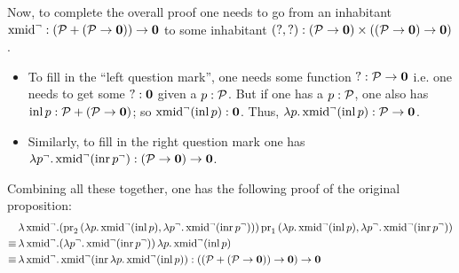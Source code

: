Now, to complete the overall proof one needs to go from an inhabitant $\text{xmid}^{\neg} : (\mathcal{P} + (\mathcal{P} \to \textbf{0})) \to \textbf{0}$ to some inhabitant $(?,?) : (\mathcal{P} \to \textbf{0}) \times ((\mathcal{P} \to \textbf{0}) \to \textbf{0})$.
\begin{itemize}
\item To fill in the ``left question mark'', one needs some function $? : \mathcal{P} \to \textbf{0}$ i.e. one needs to get some $? : \textbf{0}$ given a $p : \mathcal{P}$. But if one has a $p : \mathcal{P}$, one also has $\text{inl}\,p : \mathcal{P} + (\mathcal{P} \to \textbf{0})$; so $\text{xmid}^{\neg}(\text{inl}\,p) : \textbf{0}$. Thus, $\lambda p.\,\text{xmid}^{\neg}(\text{inl}\,p) : \mathcal{P} \to \textbf{0}$.
\item Similarly, to fill in the right question mark one has $\lambda p^{\neg}.\,\text{xmid}^{\neg}(\text{inr}\,p^{\neg}) : (\mathcal{P} \to \textbf{0}) \to \textbf{0}$.
\end{itemize}

Combining all these together, one has the following proof of the original proposition:
\begin{align*}
	&\lambda \,\text{xmid}^{\neg}. (\text{pr}_{2}\,(\lambda p.\,\text{xmid}^{\neg}(\text{inl}\,p),\lambda p^{\neg}.\,\text{xmid}^{\neg}(\text{inr}\,p^{\neg})))\,\text{pr}_{1}\,(\lambda p.\,\text{xmid}^{\neg}(\text{inl}\,p),\lambda p^{\neg}.\,\text{xmid}^{\neg}(\text{inr}\,p^{\neg})) \\
	\equiv \, &\lambda \,\text{xmid}^{\neg}. (\lambda p^{\neg}.\,\text{xmid}^{\neg}(\text{inr}\,p^{\neg}))\,\lambda p.\,\text{xmid}^{\neg}(\text{inl}\,p) \\
	\equiv \, &\lambda \,\text{xmid}^{\neg}. \,\text{xmid}^{\neg}(\text{inr}\,\lambda p.\,\text{xmid}^{\neg}(\text{inl}\,p)) : ((\mathcal{P} + (\mathcal{P} \to \textbf{0})) \to \textbf{0}) \to \textbf{0}
\end{align*}
